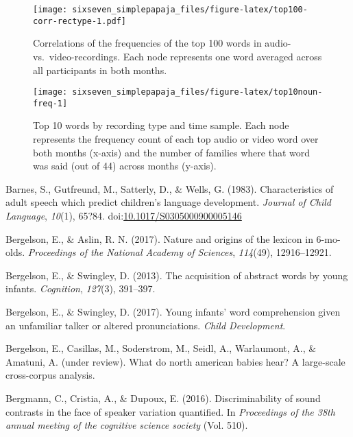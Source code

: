 \documentclass[man]{apa6}
\theoremstyle{definition}
\theoremstyle{definition}
\theoremstyle{definition}
\theoremstyle{remark}
\begin{document}
\begin{figure}
\centering
\texttt{[image: sixseven\_simplepapaja\_files/figure-latex/top100-corr-rectype-1.pdf]}
\caption{\label{fig:top100-corr-rectype}Correlations of the frequencies of
the top 100 words in audio- vs.~video-recordings. Each node represents
one word averaged across all participants in both months.}
\end{figure}

\begin{figure}
\texttt{[image: sixseven\_simplepapaja\_files/figure-latex/top10noun-freq-1]} \caption{Top 10 words by recording type and time sample. Each node represents the frequency count of each top audio or video word over both months (x-axis) and the number of families where that word was said (out of 44) across months (y-axis).}\label{fig:top10noun-freq}
\end{figure}

\setlength{\parindent}{-0.5in} \setlength{\leftskip}{0.5in}

\hypertarget{refs}{}
\hypertarget{ref-barnes1983characteristics}{}
Barnes, S., Gutfreund, M., Satterly, D., \& Wells, G. (1983).
Characteristics of adult speech which predict children's language
development. \emph{Journal of Child Language}, \emph{10}(1), 65?84.
doi:\href{https://doi.org/10.1017/S0305000900005146}{10.1017/S0305000900005146}

\hypertarget{ref-bergelson2017nature}{}
Bergelson, E., \& Aslin, R. N. (2017). Nature and origins of the lexicon
in 6-mo-olds. \emph{Proceedings of the National Academy of Sciences},
\emph{114}(49), 12916--12921.

\hypertarget{ref-bergelson2013acquisition}{}
Bergelson, E., \& Swingley, D. (2013). The acquisition of abstract words
by young infants. \emph{Cognition}, \emph{127}(3), 391--397.

\hypertarget{ref-bergelson2017young}{}
Bergelson, E., \& Swingley, D. (2017). Young infants' word comprehension
given an unfamiliar talker or altered pronunciations. \emph{Child
Development}.

\hypertarget{ref-bergelsonunderreview}{}
Bergelson, E., Casillas, M., Soderstrom, M., Seidl, A., Warlaumont, A.,
\& Amatuni, A. (under review). What do north american babies hear? A
large-scale cross-corpus analysis.

\hypertarget{ref-bergmann2016discriminability}{}
Bergmann, C., Cristia, A., \& Dupoux, E. (2016). Discriminability of
sound contrasts in the face of speaker variation quantified. In
\emph{Proceedings of the 38th annual meeting of the cognitive science
society} (Vol. 510).
\end{document}
